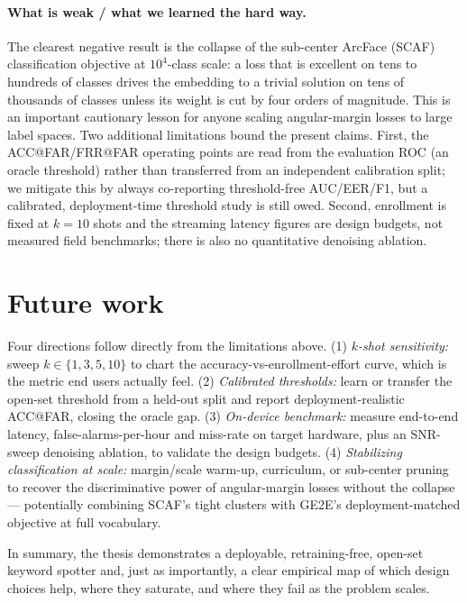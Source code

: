 \documentclass[12pt,a4paper]{report}
\begin{document}
\paragraph{What is weak / what we learned the hard way.} The clearest negative
result is the collapse of the sub-center ArcFace (SCAF) classification objective at
$10^4$-class scale: a loss that is excellent on tens to hundreds of classes drives
the embedding to a trivial solution on tens of thousands of classes unless its
weight is cut by four orders of magnitude. This is an important cautionary lesson
for anyone scaling angular-margin losses to large label spaces. Two additional
limitations bound the present claims. First, the ACC@FAR/FRR@FAR operating points
are read from the evaluation ROC (an oracle threshold) rather than transferred
from an independent calibration split; we mitigate this by always co-reporting
threshold-free AUC/EER/F1, but a calibrated, deployment-time threshold study is
still owed. Second, enrollment is fixed at $k{=}10$ shots and the streaming
latency figures are design budgets, not measured field benchmarks; there is also
no quantitative denoising ablation.

\section{Future work}\label{sec:future}

Four directions follow directly from the limitations above.
(1) \emph{$k$-shot sensitivity:} sweep $k\in\{1,3,5,10\}$ to chart the
accuracy-vs-enrollment-effort curve, which is the metric end users actually feel.
(2) \emph{Calibrated thresholds:} learn or transfer the open-set threshold from a
held-out split and report deployment-realistic ACC@FAR, closing the oracle gap.
(3) \emph{On-device benchmark:} measure end-to-end latency, false-alarms-per-hour
and miss-rate on target hardware, plus an SNR-sweep denoising ablation, to validate
the design budgets.
(4) \emph{Stabilizing classification at scale:} margin/scale warm-up, curriculum,
or sub-center pruning to recover the discriminative power of angular-margin losses
without the collapse --- potentially combining SCAF's tight clusters with GE2E's
deployment-matched objective at full vocabulary.

In summary, the thesis demonstrates a deployable, retraining-free, open-set
keyword spotter and, just as importantly, a clear empirical map of which design
choices help, where they saturate, and where they fail as the problem scales.
\end{document}
